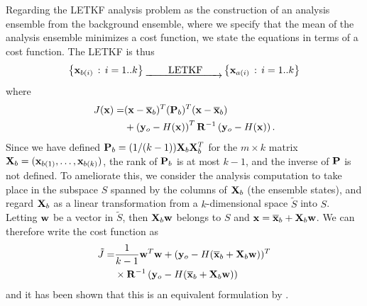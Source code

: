 Regarding the LETKF analysis problem as the construction of an analysis ensemble from the background ensemble, where we specify that the mean of the analysis ensemble minimizes a cost function, we state the equations in terms of a cost function.
The LETKF is thus
\begin{equation} \left\{ \mathbf{x} _{b(i)}\,:\, i=1..k \right\} \underrightarrow{~~~~~~~\text{LETKF}~~~~~~} \left\{ \mathbf{x} _{a(i)}\,:\,i=1..k\right\} \end{equation}
where
\begin{align*} J(\mathbf{x}) = &(\mathbf{x} - \overline{\mathbf{x}}_b) ^T (\mathbf{P}_b)^T(\mathbf{x} - \overline{\mathbf{x}}_b)\\
&+\left(\mathbf{y}_o-H(\mathbf{x})\right)^T \mathbf{R}^{-1} \left(\mathbf{y}_o-H(\mathbf{x})\right). \end{align*}
Since we have defined $\mathbf{P}_b = (1/(k-1))\mathbf{X}_b \mathbf{X}_b^T$ for the $m\times k$ matrix $\mathbf{X}_b = (\mathbf{x}_{b(1)},\ldots,\mathbf{x}_{b(k)})$, the rank of $\mathbf{P}_b$ is at most $k-1$, and the inverse of $\mathbf{P}$ is not defined.
To ameliorate this, we consider the analysis computation to take place in the subspace $S$ spanned by the columns of $\mathbf{X}_b$ (the ensemble states), and regard $\mathbf{X}_b$ as a linear transformation from a $k$-dimensional space $\tilde{S}$ into $S$.
Letting $\mathbf{w}$ be a vector in $\tilde{S}$, then $\mathbf{X}_b\mathbf{w}$ belongs to $S$ and $\mathbf{x} = \overline{\mathbf{x}}_b + \mathbf{X}_b \mathbf{w}$.
We can therefore write the cost function as
\begin{align*} \tilde{J} = &\frac{1}{k-1}\mathbf{w}^T\mathbf{w} + (\mathbf{y}_o - H(\overline{\mathbf{x}}_b+\mathbf{X}_b\mathbf{w}))^T\\
&\times \mathbf{R}^{-1}\left(\mathbf{y}_o - H(\overline{\mathbf{x}}_b+\mathbf{X}_b\mathbf{w})\right)\end{align*}
and it has been shown that this is an equivalent formulation by .

